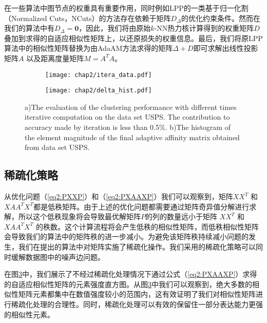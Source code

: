 在一些算法中图节点的权重具有重要作用，同时例如LPP的一类基于归一化割（Normalized Cuts，NCuts）的方法存在依赖于矩阵$D_\Delta$的优化约束条件。然而在我们的算法中有$D_\Delta = \textbf{0}$，因此，我们将由原始$k$-NN热力核计算得到的权重矩阵$D$叠加到求得的自适应相似性矩阵上，以还原损失的权重信息。最后，我们将原LPP算法中的相似性矩阵替换为由AdaAM方法求得的矩阵$\Delta+D$即可求解出线性投影矩阵$A$ 以及距离度量矩阵$M = A^TA$。

\begin{figure}[t]
	\centering
	\begin{subfigure}{0.49\textwidth}
		\centering
		\texttt{[image: chap2/itera\_data.pdf]}
		\caption{}
		\label{fig2:itera}
	\end{subfigure}
	\begin{subfigure}{0.49\textwidth}
		\centering
		\texttt{[image: chap2/delta\_hist.pdf]}
		\caption{}
		\label{fig2:Hist}
	\end{subfigure}
			  {a)The evaluation of the clustering performance with different times iterative computation on the data set USPS. The contribution to accuracy made by iteration is less than 0.5\%. b)The histogram of the element magnitude of the final adaptive affinity matrix obtained from data set USPS. }
\end{figure}

\subsection{稀疏化策略}
\label{sec2:sparse}

从优化问题（\ref{eq2:PXXP}）和（\ref{eq2:PXAAXP}）我们可以观察到，矩阵$XX^T$ 和 $XAA^TX^T$都是低秩矩阵。由于上述的优化问题都需要通过矩阵奇异值分解进行求解，所以这个低秩现象将会导致最优解矩阵$P$的列的数量远小于矩阵 $XX^T$ 和 $XAA^TX^T$ 的秩数。这个计算流程将会产生低秩的相似性矩阵，而低秩相似性矩阵会导致我们的算法中的矩阵秩的进一步减小。为避免该矩阵秩持续减小问题的发生，我们在提出的算法中对矩阵实施了稀疏化操作。我们采用的稀疏化策略可以同时缓解数据图中的噪声边问题。

在图\ref{fig2:Hist}中，我们展示了不经过稀疏化处理情况下通过公式（\ref{eq2:PXAAXP}）求得的自适应相似性矩阵的元素强度直方图。从图\ref{fig2:Hist}中我们可以观察到，绝大多数的相似性矩阵元素都集中在数值强度较小的范围内，这有效证明了我们对相似性矩阵进行稀疏化处理的合理性。同时，稀疏化处理可以有效的保留住一部分表达能力更强的相似性元素。

